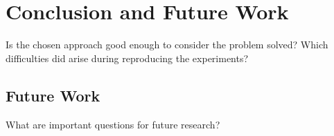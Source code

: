 \section{Conclusion and Future Work}

Is the chosen approach good enough to consider the problem solved?
Which difficulties did arise during reproducing the experiments?

\subsection{Future Work}

What are important questions for future research?
